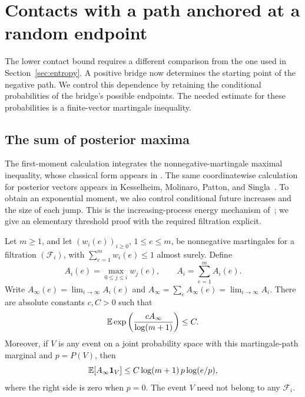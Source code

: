 \section{Contacts with a path anchored at a random endpoint}
\label{sec:posterior}

The lower contact bound requires a different comparison from the one used in
Section~\ref{sec:entropy}.  A positive bridge now determines the starting
point of the negative path.  We control this dependence by retaining the
conditional probabilities of the bridge's possible endpoints.  The needed
estimate for these probabilities is a finite-vector martingale inequality.

\subsection{The sum of posterior maxima}

The first-moment calculation integrates the nonnegative-martingale maximal
inequality, whose classical form appears in
\cite[Chapter~V, Premi\`ere section, \S2, Theorem~1]{Ville1939}.
The same coordinatewise calculation for posterior vectors appears in
Kesselheim, Molinaro, Patton, and Singla~\cite[Section~1.1]{KesselheimMolinaroPattonSingla2026}.
To obtain an exponential moment, we also control conditional future
increases and the size of each jump. This is the increasing-process
energy mechanism of~\cite[Theorem~4 and its corollary]{Kikuchi1992};
we give an elementary threshold proof with the required filtration explicit.

\begin{lemma}\label{lem:posterior-maxima}
Let $m\ge1$, and let $(w_i(e))_{i\ge0}$, $1\le e\le m$, be nonnegative
martingales for a filtration $(\mathcal F_i)$, with
$\sum_{e=1}^m w_i(e)\le1$ almost surely.  Define
\[
 A_i(e)=\max_{0\le j\le i}w_j(e),\qquad
 A_i=\sum_{e=1}^m A_i(e).
\]
Write $A_\infty(e)=\lim_{i\to\infty}A_i(e)$ and
$A_\infty=\sum_e A_\infty(e)=\lim_{i\to\infty}A_i$.
There are absolute constants $c,C>0$ such that
\begin{equation}\label{eq:posterior-exponential}
 \mathbb E\exp\left(\frac{cA_\infty}{\log(m+1)}\right)\le C.
\end{equation}
Moreover, if $V$ is any event on a joint probability space with this
martingale-path marginal and $p=P(V)$, then
\begin{equation}\label{eq:posterior-event-weight}
 \mathbb E[A_\infty\mathbf 1_V]
 \le C\log(m+1)\,p\log(e/p),
\end{equation}
where the right side is zero when $p=0$.  The event $V$ need not belong to
any $\mathcal F_i$.
\end{lemma}


